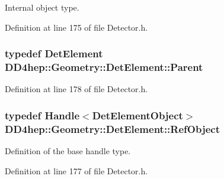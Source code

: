Internal object type. 

Definition at line 175 of file Detector.h.\hypertarget{class_d_d4hep_1_1_geometry_1_1_det_element_a31b56fd96597b66282406749b27263d1}{
\subsubsection[{Parent}]{\setlength{\rightskip}{0pt plus 5cm}typedef {\bf DetElement} {\bf DD4hep::Geometry::DetElement::Parent}}}
\label{class_d_d4hep_1_1_geometry_1_1_det_element_a31b56fd96597b66282406749b27263d1}


Definition at line 178 of file Detector.h.\hypertarget{class_d_d4hep_1_1_geometry_1_1_det_element_ae30cafd63395b1a95d161a51984db927}{
\subsubsection[{RefObject}]{\setlength{\rightskip}{0pt plus 5cm}typedef {\bf Handle}$<${\bf DetElementObject}$>$ {\bf DD4hep::Geometry::DetElement::RefObject}}}
\label{class_d_d4hep_1_1_geometry_1_1_det_element_ae30cafd63395b1a95d161a51984db927}


Definition of the base handle type. 

Definition at line 177 of file Detector.h.

